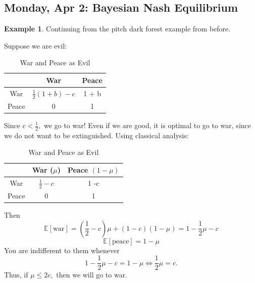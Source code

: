 \documentclass[10pt, oneside]{article}
\newcommand{\bbE}{\mathbb{E}}
\theoremstyle{definition}
\newtheorem{exmp}{Example}[section]
\begin{document}
 \newpage
 \subsection{Monday, Apr 2: Bayesian Nash Equilibrium}
 \begin{exmp}
     Continuing from the pitch dark forest example from before. 

     Suppose we are evil:
        \begin{table}[H]
        \centering
        \begin{tabular}{c|c|c}
             & War & Peace\\
             \hline
             War& $\frac{1}{2}(1 + b) -c$& 1 + b \\
             \hline
             Peace&  0& 1\\
        \end{tabular}
        \caption{War and Peace as Evil}
    \end{table}
    Since $c < \frac{1}{2},$ we go to war! Even if we are good, it is optimal to go to war, since we do not want to be extinguished. Using classical analysis:
        \begin{table}[H]
        \centering
        \begin{tabular}{c|c|c}
             & War ($\mu$)& Peace $(1 - \mu)$\\
             \hline
             War& $\frac{1}{2} -c$& 1 -c \\
             \hline
             Peace&  0& 1\\
        \end{tabular}
        \caption{War and Peace as Evil}
    \end{table}
    Then 
    \[\bbE[\text{war}] = (\frac{1}{2} - c)\mu + (1-c)(1-\mu) = 1 - \frac{1}{2}\mu -c\]
    \[\bbE[\text{peace}] = 1-\mu\] You are indifferent to them whenever 
    \[1 - \frac{1}{2}\mu -c  = 1-\mu\iff \frac{1}{2}\mu = c.\] Thus, if $\mu \leq 2c,$ then we will go to war.
 \end{exmp}
\end{document}
